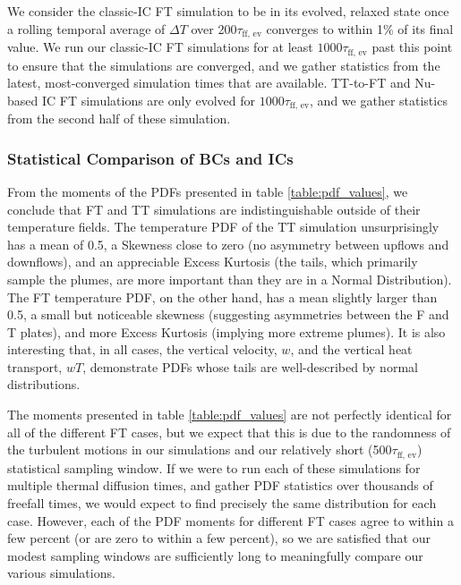 \documentclass[aps, pre, onecolumn, nofootinbib, notitlepage, groupedaddress, amsfonts, amssymb, amsmath, longbibliography, superscriptaddress]{revtex4-1}
\newcommand{\ea}[1]{{\color{red} #1}}
\begin{document}
\ea{
We consider the classic-IC FT simulation to be in its evolved, relaxed state once a rolling temporal average of $\Delta T$ over 200$\tau_{\text{ff, ev}}$ converges to within 1\% of its final value.
We run our classic-IC FT simulations for at least $1000\tau_{\text{ff, ev}}$ past this point to ensure that the simulations are converged, and we gather statistics from the latest, most-converged simulation times that are available.
TT-to-FT and Nu-based IC FT simulations are only evolved for $1000\tau_{\text{ff, ev}}$, and we gather statistics from the second half of these simulation.
}

\subsubsection{Statistical Comparison of BCs and ICs}
From the moments of the PDFs presented in table \ref{table:pdf_values}, we conclude that FT and TT simulations are indistinguishable outside of their temperature fields.
The temperature PDF of the TT simulation unsurprisingly has a mean of 0.5, a Skewness close to zero (no asymmetry between upflows and downflows), and an appreciable Excess Kurtosis (the tails, which primarily sample the plumes, are more important than they are in a Normal Distribution).
The FT temperature PDF, on the other hand, has a mean slightly larger than 0.5, a small but noticeable skewness (suggesting asymmetries between the F and T plates), and more Excess Kurtosis (implying more extreme plumes).
It is also interesting that, in all cases, the vertical velocity, $w$, and the vertical heat transport, $wT$, demonstrate PDFs whose tails are well-described by normal distributions.

\ea{
The moments presented in table \ref{table:pdf_values} are not perfectly identical for all of the different FT cases, but we expect that this is due to the randomness of the turbulent motions in our simulations and our relatively short (500$\tau_{\text{ff, ev}}$) statistical sampling window.
If we were to run each of these simulations for multiple thermal diffusion times, and gather PDF statistics over thousands of freefall times, we would expect to find precisely the same distribution for each case.
However, each of the PDF moments for different FT cases agree to within a few percent (or are zero to within a few percent), so we are satisfied that our modest sampling windows are sufficiently long to meaningfully compare our various simulations.
}
\end{document}
